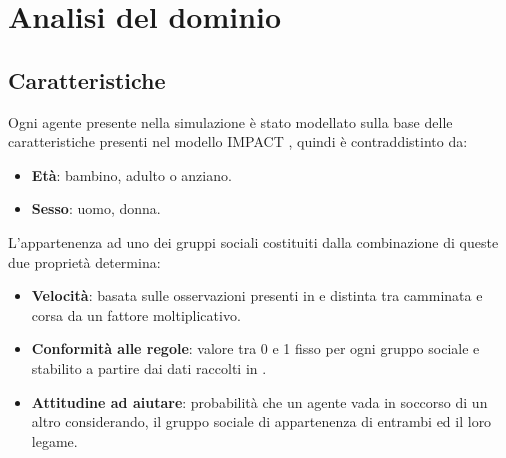\section{Analisi del dominio}

\subsection{Caratteristiche}
Ogni agente presente nella simulazione è stato modellato sulla base delle caratteristiche presenti nel modello IMPACT \cite{vanderWal2017Model}, quindi è contraddistinto da:

\begin{itemize}
 \item \textbf{Età}: bambino, adulto o anziano.
 \item \textbf{Sesso}: uomo, donna.
\end{itemize}

L'appartenenza ad uno dei gruppi sociali costituiti dalla combinazione di queste due proprietà determina:

\begin{itemize}
 \item \textbf{Velocità}: basata sulle osservazioni presenti in \cite{Willis2004} e distinta tra camminata e corsa da un fattore moltiplicativo.
 \item \textbf{Conformità alle regole}: valore tra 0 e 1 fisso per ogni gruppo sociale e stabilito a partire dai dati raccolti in \cite{Soto2011}.
 \item \textbf{Attitudine ad aiutare}: probabilità che un agente vada in soccorso di un altro considerando, il gruppo sociale di appartenenza di entrambi ed il loro legame.
\end{itemize}

